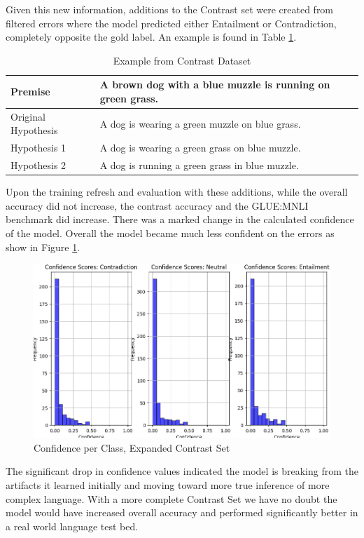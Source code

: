 \documentclass[11pt]{article}
\begin{document}
Given this new information, additions to the Contrast set were created from filtered errors where the model predicted either Entailment or Contradiction, completely opposite the gold label. An example is found in Table \ref{tab:AnnotationOfContrastSet}.
\begin{table}[!ht]
    \centering
    \begin{tabularx}{0.5\textwidth} { 
  | >{\raggedright\arraybackslash}X 
  | >{\raggedright\arraybackslash}X | }
    \hline
        Premise & A brown dog with a blue muzzle is running on green grass.\\
        \hline
        Original Hypothesis & A dog is wearing a green muzzle on blue grass.\\
        \hline
        Hypothesis 1 & A dog is wearing a green grass on blue muzzle.\\
        \hline
        Hypothesis 2 & A dog is running a green grass in blue muzzle.\\
        \hline
    \end{tabularx}
    \caption{Example from Contrast Dataset}
    \label{tab:AnnotationOfContrastSet}
\end{table}

Upon the training refresh and evaluation with these additions, while the overall accuracy did not increase, the contrast accuracy and the GLUE:MNLI benchmark did increase. There was a marked change in the calculated confidence of the model. Overall the model became much less confident on the errors as show in Figure \ref{fig:Confidence3}.
\begin{figure}[h!]
    \centering
    \includegraphics[width=0.8\linewidth]{Figure_confByClass3.png}
    \caption{Confidence per Class, Expanded Contrast Set}
    \label{fig:Confidence3}
\end{figure}
The significant drop in confidence values indicated the model is breaking from the artifacts it learned initially and moving toward more true inference of more complex language. With a more complete Contrast Set we have no doubt the model would have increased overall accuracy and performed significantly better in a real world language test bed.
\end{document}
